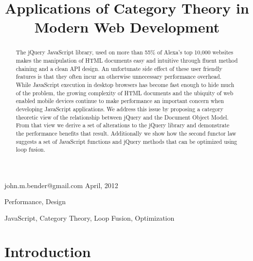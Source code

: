 \documentclass[preprint, leqno]{sigplanconf}
\begin{document}
\copyrightdata{[to be supplied]}


\title{Applications of Category Theory in Modern Web Development}

           {john.m.bender@gmail.com}
           {April, 2012}

\maketitle

\begin{abstract}
The jQuery JavaScript library, used on more than 55\% of Alexa's top 10,000 websites \cite{bib:usage} makes the manipulation of HTML documents easy and intuitive through fluent method chaining and a clean API design. An unfortunate side effect of these user friendly features is that they often incur an otherwise unnecessary performance overhead. While JavaScript execution in desktop browsers has become fast enough to hide much of the problem, the growing complexity of HTML documents and the ubiquity of web enabled mobile devices continue to make performance an important concern when developing JavaScript applications. We address this issue by proposing a category theoretic view of the relationship between jQuery and the Document Object Model. From that view we derive a set of alterations to the jQuery library and demonstrate the performance benefits that result. Additionally we show how the second functor law suggests a set of JavaScript functions and jQuery methods that can be optimized using loop fusion.
\end{abstract}


\terms
Performance, Design

\keywords
JavaScript, Category Theory, Loop Fusion, Optimization

\section{Introduction}
\end{document}
